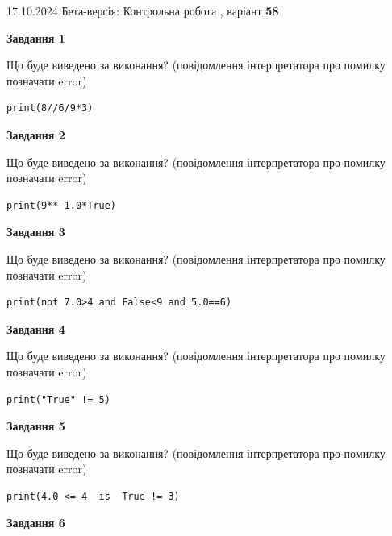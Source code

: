 \documentclass[12pt, ukrainian]{article}
\begin{document}
{\Large{17.10.2024 Бета-версія: Контрольна робота , варіант  \No \textbf { 58 }\par}}
{
\begin {large}
{\begin {center}\textbf{Завдання 1}\end {center}}

Що буде виведено за виконання? (повідомлення інтерпретатора про помилку позначати error)\par
\begin{verbatim}
print(8//6/9*3)
\end{verbatim}

{\begin {center}\textbf{Завдання 2}\end {center}}

Що буде виведено за виконання? (повідомлення інтерпретатора про помилку позначати error)\par
\begin{verbatim}
print(9**-1.0*True)
\end{verbatim}

{\begin {center}\textbf{Завдання 3}\end {center}}

Що буде виведено за виконання? (повідомлення інтерпретатора про помилку позначати error)\par
\begin{verbatim}
print(not 7.0>4 and False<9 and 5.0==6)
\end{verbatim}

{\begin {center}\textbf{Завдання 4}\end {center}}

Що буде виведено за виконання? (повідомлення інтерпретатора про помилку позначати error)\par
\begin{verbatim}
print("True" != 5)
\end{verbatim}

{\begin {center}\textbf{Завдання 5}\end {center}}

Що буде виведено за виконання? (повідомлення інтерпретатора про помилку позначати error)\par
\begin{verbatim}
print(4.0 <= 4  is  True != 3)
\end{verbatim}

{\begin {center}\textbf{Завдання 6}\end {center}}


\end{large}}
\end{document}
